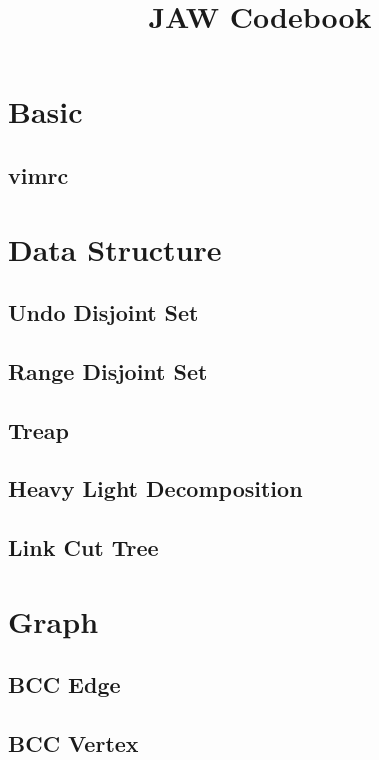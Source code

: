 \documentclass[a4paper,10pt,twocolumn,oneside]{article}
\title{JAW Codebook}
\author{}
\date{}
\begin{document}
\maketitle
\tableofcontents

\section{Basic}
\subsection{vimrc}


\section{Data Structure}
\subsection{Undo Disjoint Set}

\subsection{Range Disjoint Set}


\subsection{Treap}

\subsection {Heavy Light Decomposition}

\subsection {Link Cut Tree}


\section{Graph}
\subsection{BCC Edge}

\subsection{BCC Vertex}

\end{document}
